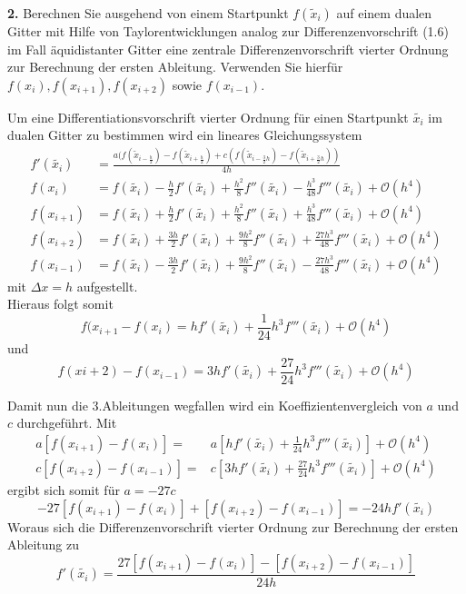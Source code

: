 \documentclass[Protokollheft.tex]{subfiles}
\begin{document}
    \begin{framed}
	\noindent \textbf{2.} Berechnen Sie ausgehend von einem Startpunkt \(f(\tilde{x}_i)\) auf einem dualen Gitter mit Hilfe von Taylorentwicklungen analog zur Differenzenvorschrift (1.6) im Fall äquidistanter Gitter eine zentrale Differenzenvorschrift vierter Ordnung zur Berechnung der ersten Ableitung. Verwenden Sie hierfür \(f(x_i), f(x_{i+1}), f(x_{i+2})\) sowie \(f(x_{i-1})\).\label{exer:diffquotOrd4}
\end{framed}

Um eine Differentiationsvorschrift vierter Ordnung für einen Startpunkt $\tilde{x_i}$ im dualen Gitter zu bestimmen wird ein lineares Gleichungssystem 
\begin{align}
\label{eq:dgl}
f'(\tilde{x_i}) &= \frac{a(f(\tilde{x}_{i-\frac{h}{2}})-f(\tilde{x}_{i+\frac{h}{2}})+c(f(\tilde{x}_{i-\frac{3}{2}h})-f(\tilde{x}_{i+\frac{3}{2}h}))}{4h} \nonumber\\
f({x_i}) & = f(\tilde{x_i}) - \frac{h}{2}f'(\tilde{x_i})+\frac{h^2}{8}f''(\tilde{x_i})-\frac{h^3}{48}f'''(\tilde{x_i}) + \mathcal{O}(h^4) \nonumber\\
f({x_{i+1}}) & = f(\tilde{x_i}) + \frac{h}{2}f'(\tilde{x_i})+\frac{h^2}{8}f''(\tilde{x_i})+\frac{	h^3}{48}f'''(\tilde{x_i}) + \mathcal{O}(h^4)\\
f({x_{i+2}}) & = f(\tilde{x_i}) + \frac{3h}{2}f'(\tilde{x_i})+\frac{9h^2}{8}f''(\tilde{x_i})+\frac{27h^3}{48}f'''(\tilde{x_i}) + \mathcal{O}(h^4) \nonumber\\
f({x_{i-1}}) & = f(\tilde{x_i}) - \frac{3h}{2}f'(\tilde{x_i})+\frac{9h^2}{8}f''(\tilde{x_i})-\frac{27h^3}{48}f'''(\tilde{x_i}) + \mathcal{O}(h^4) \nonumber
\end{align}
mit $\Delta x = h$ aufgestellt. \\
Hieraus folgt somit
\begin{equation}
\label{eq:LGS}
f(x_{i+1} - f(x_i) = hf'(\tilde{x_i}) + \frac{1}{24}h^3 f'''(\tilde{x_i})+\mathcal{O}(h^4) 
\end{equation}
und
\begin{equation}
\label{eq:LGS2}
f(x{i+2}) - f(x_{i-1})=3hf'(\tilde{x_i}) + \frac{27}{24}h^3f'''(\tilde{x_i}) + \mathcal{O}(h^4)
\end{equation}

Damit nun die 3.Ableitungen wegfallen wird ein Koeffizientenvergleich von $a$ und $c$ durchgeführt.
Mit 
\begin{align*}
a[f(x_{i+1})-f(x_i)] =& a[hf'(\tilde{x_i}) + \frac{1}{24}h^3 f'''(\tilde{x_i})]+\mathcal{O}(h^4) \\
c[f(x_{i+2})-f(x_{i-1})] =& c[3hf'(\tilde{x_i}) + \frac{27}{24}h^3f'''(\tilde{x_i}) ]+ \mathcal{O}(h^4)
\end{align*}
ergibt sich somit für $a = -27c$ 
\begin{equation*}
-27[f(x_{i+1})-f(x_i)]+[f(x_{i+2})-f(x_{i-1})] = -24 hf'(\tilde{x_i})
\end{equation*}
Woraus sich die Differenzenvorschrift vierter Ordnung zur Berechnung der ersten Ableitung zu 
\begin{equation}
\label{eq:DifVorOrd4}
f'(\tilde{x_i}) = \frac{27[f(x_{i+1})-f(x_i)]-[f(x_{i+2})-f(x_{i-1})]}{24h}
\end{equation}
\end{document}
